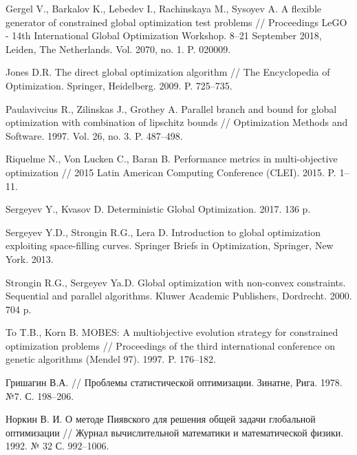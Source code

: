 \documentclass{cmi}
\begin{document}
\begin{biblio}
  Gergel V., Barkalov K., Lebedev I., Rachinskaya M., Sysoyev A.
  \newblock A flexible generator of constrained global optimization test
    problems // Proceedings LeGO - 14th International Global Optimization Workshop. 8–21 September 2018, Leiden, The Netherlands. Vol. 2070, no. 1. P. 020009.
  \newblock {}

  {Jones D.R.}
  \newblock The direct global optimization algorithm
  \newblock // The Encyclopedia of Optimization. Springer, Heidelberg. 2009. P.
    725--735.
  \newblock {}

  {Paulavivcius R., Zilinskas J., Grothey A.}
  \newblock Parallel branch and bound for global optimization with combination of
    lipschitz bounds //
  \newblock Optimization Methods and Software. 1997. Vol. 26, no. 3. P. 487--498.
  \newblock {}

  {Riquelme} N., {Von Lucken} C., {Baran} B.
  \newblock Performance metrics in multi-objective optimization
  \newblock // 2015 Latin American Computing Conference (CLEI). 2015. P. 1--11.
  \newblock {}

  Sergeyev Y., Kvasov D. Deterministic Global Optimization. 2017. 136 p.
  \newblock {}

  {Sergeyev Y.D., Strongin R.G., Lera D.} Introduction to global optimization
    exploiting space-filling curves.
  \newblock Springer Briefs in Optimization, Springer, New York. 2013.
  \newblock {}

  {Strongin R.G., Sergeyev Ya.D.} Global optimization with non-convex
    constraints. Sequential and parallel algorithms.
  \newblock Kluwer Academic Publishers, Dordrecht. 2000. 704 p.
  \newblock {}

  To T.B., Korn B.
  \newblock MOBES: A multiobjective evolution strategy for constrained optimization problems
  // Proceedings of the third international conference on genetic algorithms (Mendel 97). 1997. P. 176--182.

  {Гришагин В.А.}
  \newblock // Проблемы статистической
    оптимизации. Зинатне, Рига. 1978. №7. С. 198–206.

  {Норкин В. И.}
  \newblock О методе Пиявского для решения общей
    задачи глобальной оптимизации //
  \newblock Журнал вычислительной математики и математической физики. 1992. № 32 С. 992--1006.
\end{biblio}
\end{document}
